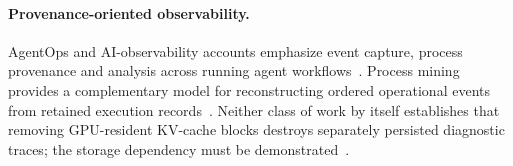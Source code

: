 \paragraph{Provenance-oriented observability.}
AgentOps and AI-observability accounts emphasize event capture, process provenance and analysis across running agent workflows~\cite{ext008,ext009}.
Process mining provides a complementary model for reconstructing ordered operational events from retained execution records~\cite{ext011,ext014}.
Neither class of work by itself establishes that removing GPU-resident KV-cache blocks destroys separately persisted diagnostic traces; the storage dependency must be demonstrated~\cite{ext141}.

